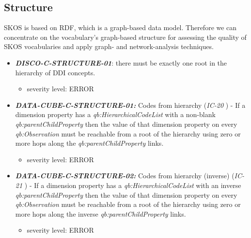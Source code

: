 \documentclass{llncs}
\begin{document}
\subsection{Structure}

SKOS is based on RDF, which is a graph-based data model. Therefore we can concentrate on the vocabulary's graph-based structure for assessing the quality of SKOS vocabularies and apply graph- and network-analysis techniques. 

\begin{itemize}
	\item \textbf{{\em DISCO-C-STRUCTURE-01}}: there must be exactly one root in the hierarchy of DDI concepts. 
	\begin{itemize}
		\item severity level: ERROR
	\end{itemize}
\end{itemize} 

\begin{itemize}
	\item \textbf{{\em DATA-CUBE-C-STRUCTURE-01:}}
	Codes from hierarchy (\emph{IC-20} \cite{CyganiakReynolds2014}) -  
	If a dimension property has a \emph{qb:HierarchicalCodeList} with a non-blank \emph{qb:parentChildProperty} then the value of that dimension property on every \emph{qb:Observation} must be reachable from a root of the hierarchy using zero or more hops along the \emph{qb:parentChildProperty} links. 
	\begin{itemize}
		\item severity level: ERROR
	\end{itemize}
	\item \textbf{{\em DATA-CUBE-C-STRUCTURE-02:}}
	Codes from hierarchy (inverse) (\emph{IC-21} \cite{CyganiakReynolds2014}) -  
	If a dimension property has a \emph{qb:HierarchicalCodeList} with an inverse \emph{qb:parentChildProperty} then the value of that dimension property on every \emph{qb:Observation} must be reachable from a root of the hierarchy using zero or more hops along the inverse \emph{qb:parentChildProperty} links. 
	\begin{itemize}
		\item severity level: ERROR
	\end{itemize}
\end{itemize}
\end{document}
